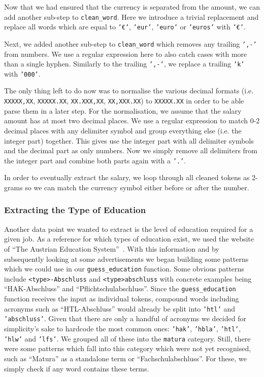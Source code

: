 \documentclass[runningheads]{llncs}
\newcommand{\german}[1]{{#1}}
\begin{document}
Now that we had ensured that the currency is separated from the amount, we can add another sub-step to \texttt{clean\_word}. Here we introduce a trivial replacement and replace all words which are equal to \texttt{'€'}, \texttt{'eur'}, \texttt{'euro'} or \texttt{'euros'} with \texttt{'€'}.

Next, we added another sub-step to \texttt{clean\_word} which removes any trailing \texttt{',-'} from numbers. We use a regular expression here to also catch cases with more than a single hyphen. Similarly to the trailing \texttt{',-'}, we replace a trailing \texttt{'k'} with \texttt{'000'}.

The only thing left to do now was to normalise the various decimal formats (i.e. \texttt{XXXXX,XX}, \texttt{XXXXX.XX}, \texttt{XX.XXX,XX}, \texttt{XX,XXX.XX}) to \texttt{XXXXX.XX} in order to be able parse them in a later step. For the normalisation, we assume that the salary amount has at most two decimal places. We use a regular expression to match 0-2 decimal places with any delimiter symbol and group everything else (i.e. the integer part) together. This gives use the integer part with all delimiter symbols and the decimal part as only numbers. Now we simply remove all delimiters from the integer part and combine both parts again with a \texttt{'.'}.

In order to eventually extract the salary, we loop through all cleaned tokens as 2-grams so we can match the currency symbol either before or after the number.

\subsubsection{Extracting the Type of Education}
\label{subsub:extracting_the_type_of_education}

Another data point we wanted to extract is the level of education required for a given job. As a reference for which types of education exist, we used the website of “The Austrian Education System”~\cite{austrian_education_system}. With this information and by subsequently looking at some advertisements we began building some patterns which we could use in our \texttt{guess\_education} function. Some obvious patterns include \texttt{<type>-Abschluss} and \texttt{<type>abschluss} with concrete examples being “\german{HAK-Abschluss}” and “\german{Pflichtschulabschluss}”. Since the \texttt{guess\_education} function receives the input as individual tokens, compound words including acronyms such as “\german{HTL-Abschluss}” would already be split into \texttt{'htl'} and \texttt{'abschluss'}. Given that there are only a handful of acronyms we decided for simplicity's sake to hardcode the most common ones: \texttt{'hak'}, \texttt{'hbla'}, \texttt{'htl'}, \texttt{'hlw'} and \texttt{'lfs'}. We grouped all of these into the \texttt{matura} category. Still, there were some patterns which fall into this category which were not yet recognised, such as “\german{Matura}” as a standalone term or “\german{Fachschulabschluss}”. For these, we simply check if any word contains these terms.
\end{document}
